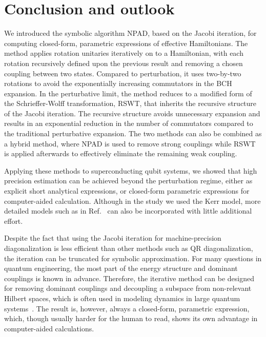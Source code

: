 \documentclass[%
 reprint,
 amsmath,amssymb,
 aps,
pra,
noeprint,
superscriptaddress,
]{revtex4-2}
\begin{document}
\section{Conclusion and outlook}
\label{sec:conclusion}
We introduced the symbolic algorithm NPAD, based on the Jacobi iteration, for computing closed-form, parametric expressions of effective Hamiltonians.
The method applies rotation unitaries iteratively on to a Hamiltonian, with each rotation recursively defined upon the previous result and removing a chosen coupling between two states.
Compared to perturbation, it uses two-by-two rotations to avoid the exponentially increasing commutators in the BCH expansion.
In the perturbative limit, the method reduces to a modified form of the Schrieffer-Wolff transformation, RSWT, that inherits the recursive structure of the Jacobi iteration.
The recursive structure avoids unnecessary expansion and results in an exponential reduction in the number of commutators compared to the traditional perturbative expansion.
The two methods can also be combined as a hybrid method, where NPAD is used to remove strong couplings while RSWT is applied afterwards to effectively eliminate the remaining weak coupling.

Applying these methods to superconducting qubit systems, we showed that high precision estimation can be achieved beyond the perturbation regime, either as explicit short analytical expressions, or closed-form parametric expressions for computer-aided calculation.
Although in the study we used the Kerr model, more detailed models such as in Ref.~\cite{Malekakhlagh2020} can also be incorporated with little additional effort.

Despite the fact that using the Jacobi iteration for machine-precision diagonalization is less efficient than other methods such as QR diagonalization, the iteration can be truncated for symbolic approximation.
For many questions in quantum engineering, the most part of the energy structure and dominant couplings is known in advance.
Therefore, the iterative method can be designed for removing dominant couplings and decoupling a subspace from non-relevant Hilbert spaces, which is often used in modeling dynamics in large quantum systems~\cite{Baker2018, Gualdi2013}.
The result is, however, always a closed-form, parametric expression,
which, though usually harder for the human to read, shows its own advantage in computer-aided calculations.
\end{document}
